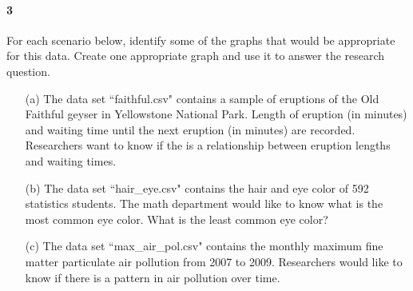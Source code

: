 \documentclass{article}
\begin{document}
\begin{flushleft}
\newpage
\paragraph{3} For each scenario below, identify some of the graphs that would be appropriate for this data. Create one appropriate graph and use it to answer the research question.

\begin{itemize}
\item [(a)] The data set ``faithful.csv" contains a sample of eruptions of the Old Faithful geyser in Yellowstone National Park. Length of eruption (in minutes) and waiting time until the next eruption (in minutes) are recorded. Researchers want to know if the is a relationship between eruption lengths and waiting times.
\vspace{2in}
\item[(b)] The data set ``hair\_eye.csv" contains the hair and eye color of 592 statistics students. The math department would like to know what is the most common eye color. What is the least common eye color?
\vspace{2in}
\item[(c)] The data set ``max\_air\_pol.csv" contains the monthly maximum fine matter particulate air pollution from 2007 to 2009. Researchers would like to know if there is a pattern in air pollution over time.
\end{itemize}


\end{flushleft}
\end{document}
